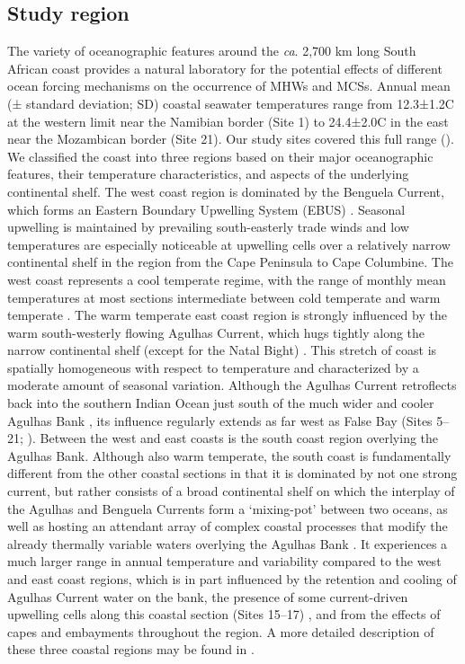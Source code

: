 \documentclass[a4paper,10pt,review]{elsarticle}
\begin{document}
\subsection{Study region}
The variety of oceanographic features around the \emph{ca}. 2,700 km long South African coast provides a natural laboratory for the potential effects of different ocean forcing mechanisms on the occurrence of MHWs and MCSs. Annual mean (± standard deviation; SD) coastal seawater temperatures range from 12.3±1.2\degree C at the western limit near the Namibian border (Site 1) to 24.4±2.0\degree C in the east near the Mozambican border (Site 21). Our study sites covered this full range (). We classified the coast into three regions based on their major oceanographic features, their temperature characteristics, and aspects of the underlying continental shelf. The west coast region is dominated by the Benguela Current, which forms an Eastern Boundary Upwelling System (EBUS) \citep{Hutchings2009}. Seasonal upwelling is maintained by prevailing south-easterly trade winds and low temperatures are especially noticeable at upwelling cells over a relatively narrow continental shelf in the region from the Cape Peninsula to Cape Columbine. The west coast represents a cool temperate regime, with the range of monthly mean temperatures at most sections intermediate between cold temperate and warm temperate \citep{Luning1990}. The warm temperate east coast region is strongly influenced by the warm south-westerly flowing Agulhas Current, which hugs tightly along the narrow continental shelf (except for the Natal Bight) \citep{Luning1990}. This stretch of coast is spatially homogeneous with respect to temperature and characterized by a moderate amount of seasonal variation. Although the Agulhas Current retroflects back into the southern Indian Ocean \citep{Hutchings2009} just south of the much wider and cooler Agulhas Bank \citep{Roberts2005}, its influence regularly extends as far west as False Bay (Sites 5--21; ). Between the west and east coasts is the south coast region overlying the Agulhas Bank. Although also warm temperate, the south coast is fundamentally different from the other coastal sections in that it is dominated by not one strong current, but rather consists of a broad continental shelf on which the interplay of the Agulhas and Benguela Currents form a `mixing-pot' between two oceans, as well as hosting an attendant array of complex coastal processes that modify the already thermally variable waters overlying the Agulhas Bank \citep{Lutjeharms2003, Roberts2005, Hutchings2009}. It experiences a much larger range in annual temperature and variability compared to the west and east coast regions, which is in part influenced by the retention and cooling of Agulhas Current water on the bank, the presence of some current-driven upwelling cells along this coastal section (Sites 15--17) \citep{Roberts2005}, and from the effects of capes and embayments throughout the region. A more detailed description of these three coastal regions may be found in \citet{Smit2013}.
\end{document}
